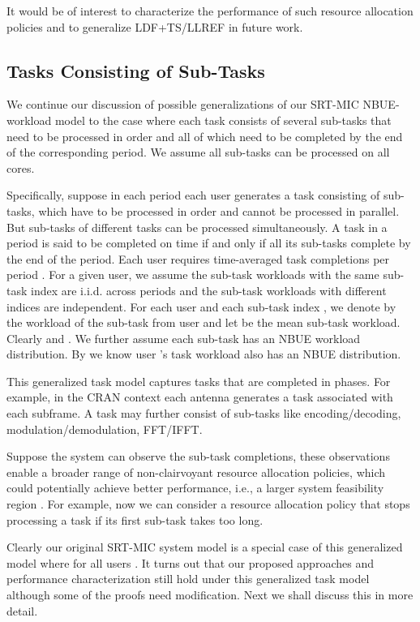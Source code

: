 \documentclass[prodmode,acmtompecs]{acmsmall}
\begin{document}
It would be of interest to characterize the performance of such resource allocation policies and to generalize LDF+TS/LLREF in future work. 

\subsection{Tasks Consisting of Sub-Tasks}
We continue our discussion of possible generalizations of our SRT-MIC NBUE-workload model to the case where each task consists of several sub-tasks that need to be processed in order and all of which need to be completed by the end of the corresponding period. We assume all sub-tasks can be processed on all cores. 

Specifically, suppose in each period each user  generates a task consisting of  sub-tasks, which have to be processed in order and cannot be processed in parallel. But sub-tasks of different tasks can be processed simultaneously. A task in a period is said to be completed on time if and only if all its sub-tasks complete by the end of the period. Each user  requires time-averaged task completions per period . 
For a given user, we assume the sub-task workloads with the same sub-task index are i.i.d. across periods and the sub-task workloads with different indices are independent. 
For each user  and each sub-task index , we denote by  the workload of the  sub-task from user  and let  be the mean sub-task workload. Clearly  and . 
We further assume each sub-task has an NBUE workload distribution. By \cite{ShS07b} we know user 's task workload  also has an NBUE distribution. 

This generalized task model captures tasks that are completed in phases. For example, in the CRAN context each antenna generates a task associated with each subframe. A task may further consist of sub-tasks like encoding/decoding, modulation/demodulation, FFT/IFFT.

Suppose the system can observe the sub-task completions, these observations enable a broader range of non-clairvoyant resource allocation policies, which could potentially achieve better performance, i.e., a larger system feasibility region . For example, now we can consider a resource allocation policy that stops processing a task if its first sub-task takes too long. 

Clearly our original SRT-MIC  system model is a special case of this generalized model where  for all users . 
It turns out that our proposed approaches and performance characterization still hold under this generalized task model although some of the proofs need modification. Next we shall discuss this in more detail. 
\end{document}
